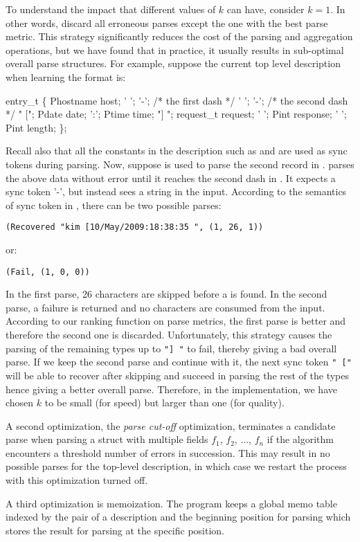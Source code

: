 To understand the impact that different values of $k$ can have,
consider $k=1$.  In other words, discard all erroneous parses except
the one with the best parse metric. This strategy significantly reduces the
cost of the parsing and aggregation operations, but we have found
that in practice,
it usually results in sub-optimal overall parse structures. 
For example, suppose the current top level description  when learning 
the \ai{} format is:
\begin{code}
  entry_t \{
         Phostname      host;
   ' ';  
   '-';  /* the first dash */
   ' ';  
   '-';	 /* the second dash */   
   " ["; Pdate          date;
   ':';  Ptime          time;
   "] "; request_t      request;
   ' ';  Pint           response;
   ' ';  Pint           length;
\};
\end{code}
Recall also that all the constants in the description such as
 and  are used as sync tokens during
parsing. Now, suppose  is used to parse the second record 
in .
 parses the above data without error until it
reaches the second dash in . It expects a sync token
'-', but instead sees a string  in the input.
According to the semantics of sync token in ,
there can be two possible parses:

\noindent
{\footnotesize
\verb#(Recovered "kim [10/May/2009:18:38:35 ", (1, 26, 1))#
}

\noindent
or:

\noindent
{\footnotesize
\verb#(Fail, (1, 0, 0))#
}

In the first parse, 26 characters are skipped before a  is found.
In the second parse, a failure is returned and no characters are consumed
from the input.
According to our ranking function on parse metrics, 
the first parse is better and therefore the
second one is discarded. Unfortunately, this strategy causes the parsing of the
remaining types up to \verb#"] "# to fail, thereby giving a bad overall parse.
If we keep the second parse and continue with it, the next sync token 
\verb#" ["# will be able to recover after skipping  and succeed
in parsing the rest of the types hence giving a better overall parse.
Therefore, in the implementation, we have chosen $k$ to be small 
(for speed) but larger than one (for quality).

A second optimization, the {\em parse cut-off} optimization, terminates a
candidate parse when parsing a struct with multiple
fields $f_1$, $f_2$, ..., $f_n$ if the algorithm encounters 
a threshold number of errors in succession. 
This may result in no possible parses for the
top-level description, in which case we restart the process
with this optimization turned off. 

A third optimization is memoization.
The program keeps a global memo table indexed by the pair of a
description  and the beginning position for parsing  which
stores the result for parsing  at the specific position.


